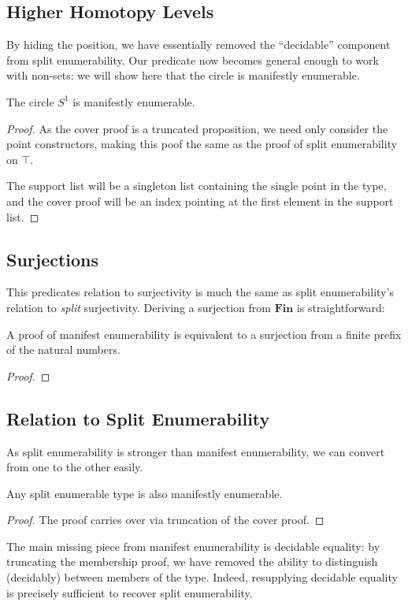 \subsection{Higher Homotopy Levels}
By hiding the position, we have essentially removed the ``decidable'' component
from split enumerability.
Our predicate now becomes general enough to work with non-sets: we will show
here that the circle is manifestly enumerable.
\begin{rm-theorem}
  The circle \(S^1\) is manifestly enumerable.
\end{rm-theorem}
\begin{proof}
  As the cover proof is a truncated proposition, we need only consider the point
  constructors, making this poof the same as the proof of split enumerability on
  \(\top\).

  The support list will be a singleton list containing the single point in the
  type, and the cover proof will be an index pointing at the first element in
  the support list.

\end{proof}
\subsection{Surjections}
This predicates relation to surjectivity is much the same as split
enumerability's relation to \emph{split} surjectivity.
Deriving a surjection from \(\mathbf{Fin}\) is straightforward:
\begin{rm-lemma}
  A proof of manifest enumerability is equivalent to a surjection from a finite
  prefix of the natural numbers.
\end{rm-lemma}
\begin{proof}
\end{proof}
\subsection{Relation to Split Enumerability}
As split enumerability is stronger than manifest enumerability, we can convert
from one to the other easily.
\begin{rm-lemma}
  Any split enumerable type is also manifestly enumerable.
\end{rm-lemma}
\begin{proof}
  The proof carries over via truncation of the cover proof.
\end{proof}
The main missing piece from manifest enumerability is decidable equality: by
truncating the membership proof, we have removed the ability to distinguish
(decidably) between members of the type.
Indeed, resupplying decidable equality is precisely sufficient to recover split
enumerability.

